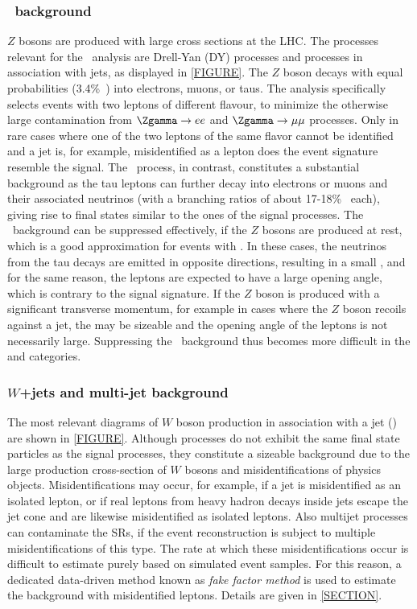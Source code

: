 \subsubsection{\Ztautau\ background}
$Z$ bosons are produced with large cross sections at the LHC. The processes relevant for the \HWW\ analysis are Drell-Yan (DY) processes and \Zgamma processes in association with jets, as displayed in \cref{FIGURE}. 
The $Z$ boson decays with equal probabilities (3.4\%~\cite{PDG2020}) into electrons, muons, or taus. 
The analysis specifically selects events with two leptons of different flavour, to minimize the otherwise large contamination from $\Zgamma \to ee$ and $\Zgamma \to \mu\mu$ processes. Only in rare cases where one of the two leptons of the same flavor cannot be identified and a jet is, for example, misidentified as a lepton does the event signature resemble the signal. 
The \Ztautau\ process, in contrast, constitutes a substantial background as the tau leptons can further decay into electrons or muons and their associated neutrinos (with a branching ratios of about 17-18\%~\cite{PDG2020} each), giving rise to final states similar to the ones of the signal processes. 
The \Ztautau\ background can be suppressed effectively, if the $Z$ bosons are produced at rest, which is a good approximation for events with \ZeroJet. In these cases, the neutrinos from the tau decays are emitted in opposite directions, resulting in a small \MET, and for the same reason, the leptons are expected to have a large opening angle, which is contrary to the signal signature. 
If the $Z$ boson is produced with a significant transverse momentum, for example in cases where the $Z$ boson recoils against a jet, the \MET may be sizeable and the opening angle of the leptons is not necessarily large. 
Suppressing the \Ztautau\ background thus becomes more difficult in the \OneJet and \TwoJet categories. 


\subsubsection{$W$+jets and multi-jet background}
The most relevant diagrams of $W$ boson production in association with a jet (\Wjets) are shown in \cref{FIGURE}.
Although \Wjets processes do not exhibit the same final state particles as the signal processes, they constitute a sizeable background due to the large production cross-section of $W$ bosons and misidentifications of physics objects.
Misidentifications may occur, for example, if a jet is misidentified as an isolated lepton, or if real leptons from heavy hadron decays inside jets escape the jet cone and are likewise misidentified as isolated leptons. 
Also multijet processes can contaminate the SRs, if the event reconstruction is subject to multiple misidentifications of this type.
The rate at which these misidentifications occur is difficult to estimate purely based on simulated event samples. For this reason, a dedicated data-driven method known as \emph{fake factor method} is used to estimate the background with misidentified leptons. Details are given in \cref{SECTION}.

